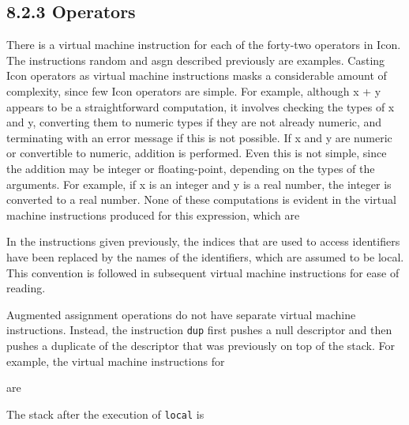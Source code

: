 \subsection[8.2.3 Operators]{8.2.3 \textbf{Operators}}

There is a virtual machine instruction for each of the forty-two
operators in Icon. The instructions random and asgn described
previously are examples. Casting Icon operators as virtual machine
instructions masks a considerable amount of complexity, since few Icon
operators are simple. For example, although x + y appears to be a
straightforward computation, it involves checking the types of x and
y, converting them to numeric types if they are not already numeric,
and terminating with an error message if this is not possible. If x
and y are numeric or convertible to numeric, addition is
performed. Even this is not simple, since the addition may be integer
or floating-point, depending on the types of the arguments. For
example, if x is an integer and y is a real number, the integer is
converted to a real number. None of these computations is evident in
the virtual machine instructions produced for this expression, which
are

\goodbreak
{}

In the instructions given previously, the indices that are used to
access identifiers have been replaced by the names of the identifiers,
which are assumed to be local. This convention is followed in
subsequent virtual machine instructions for ease of reading.

Augmented assignment operations do not have separate virtual machine
instructions. Instead, the instruction \texttt{dup} first pushes a
null descriptor and then pushes a duplicate of the descriptor that was
previously on top of the stack.  For example, the virtual machine
instructions for


are

\goodbreak
{}

The stack after the execution of \texttt{local} is

